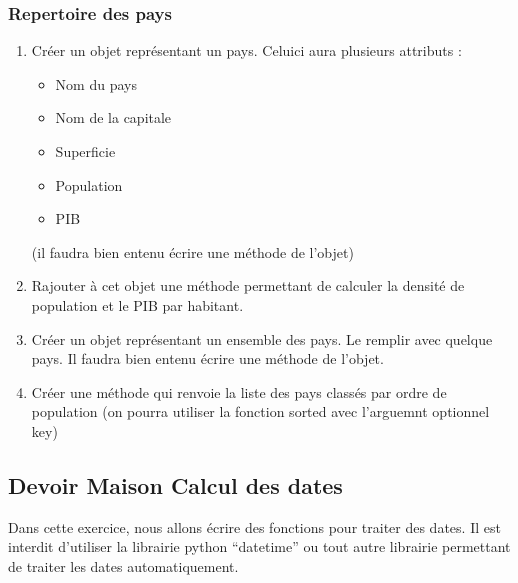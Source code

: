 \documentclass[letterpaper,10pt,english]{sphinxhowto}
\begin{document}
\subsubsection{Repertoire des pays}
\label{\detokenize{exercices_objets:repertoire-des-pays}}\begin{enumerate}
%
\item {} 
\sphinxAtStartPar
Créer un objet représentant un pays. Celui\sphinxhyphen{}ci aura plusieurs attributs :
\begin{itemize}
\item {} 
\sphinxAtStartPar
Nom du pays

\item {} 
\sphinxAtStartPar
Nom de la capitale

\item {} 
\sphinxAtStartPar
Superficie

\item {} 
\sphinxAtStartPar
Population

\item {} 
\sphinxAtStartPar
PIB

\end{itemize}

\sphinxAtStartPar
(il faudra bien entenu écrire une méthode  de l’objet)

\item {} 
\sphinxAtStartPar
Rajouter à cet objet une méthode permettant de calculer la densité de population et le PIB par habitant.

\item {} 
\sphinxAtStartPar
Créer un objet représentant un ensemble des pays. Le remplir avec quelque pays. Il faudra bien entenu écrire une méthode  de l’objet.

\item {} 
\sphinxAtStartPar
Créer une méthode qui renvoie la liste des pays classés par ordre de population (on pourra utiliser la fonction sorted avec l’arguemnt optionnel key)

\end{enumerate}


\subsection{Devoir Maison \sphinxhyphen{} Calcul des dates}
\label{\detokenize{devoir_maison_Devoir Maison:devoir-maison-calcul-des-dates}}\label{\detokenize{devoir_maison_Devoir Maison::doc}}
\sphinxAtStartPar
Dans cette exercice, nous allons écrire des fonctions pour traiter des dates. Il est interdit d’utiliser la librairie python “datetime” ou tout autre librairie permettant de traiter les dates automatiquement.
\end{document}
